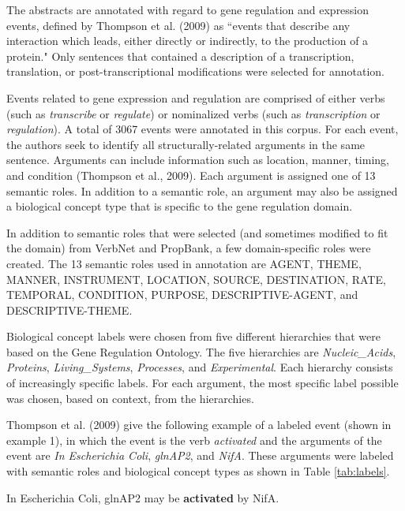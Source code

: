 \documentclass[11pt]{article}
\begin{document}

The abstracts are annotated with regard to gene regulation and expression events, defined by Thompson et al. (2009) as ``events that describe any interaction which leads, either directly or indirectly, to the production of a protein."  Only sentences that contained a description of a transcription, translation, or post-transcriptional modifications were selected for annotation.

Events related to gene expression and regulation are comprised of either verbs (such as {\it transcribe} or {\it regulate}) or nominalized verbs (such as {\it transcription} or {\it regulation}).  A total of 3067 events were annotated in this corpus.  For each event, the authors seek to identify all structurally-related arguments in the same sentence.  Arguments can include information such as location, manner, timing, and condition (Thompson et al., 2009).  Each argument is assigned one of 13 semantic roles.  In addition to a semantic role, an argument may also be assigned a biological concept type that is specific to the gene regulation domain. 

In addition to semantic roles that were selected (and sometimes modified to fit the domain) from VerbNet and PropBank,  a few domain-specific roles were created.  The 13 semantic roles used in annotation are AGENT, THEME, MANNER, INSTRUMENT, LOCATION, SOURCE, DESTINATION, RATE, TEMPORAL, CONDITION, PURPOSE, DESCRIPTIVE-AGENT, and DESCRIPTIVE-THEME.

Biological concept labels were chosen from five different hierarchies that were based on the Gene Regulation Ontology.  The five hierarchies are {\it Nucleic\_Acids}, {\it Proteins}, {\it Living\_Systems}, {\it Processes}, and {\it Experimental}.  Each hierarchy consists of increasingly specific labels.  For each argument, the most specific label  possible was chosen, based on context, from the hierarchies.

Thompson et al. (2009) give the following example of a labeled event (shown in example 1), in which the event is the verb {\it activated} and the arguments of the event are {\it In Escherichia Coli}, {\it glnAP2},  and {\it NifA}.  These arguments were labeled with semantic roles and biological concept types as shown in Table \ref{tab:labels}.

\begin{exe}
	\ex In Escherichia Coli, glnAP2 may be {\bf activated} by NifA.
\end{exe}
\end{document}
